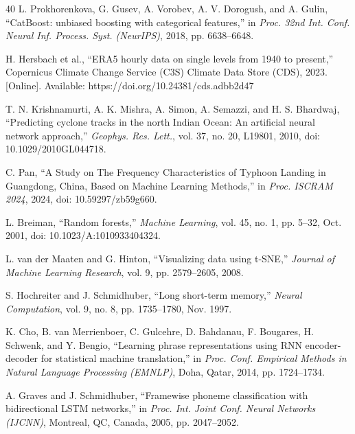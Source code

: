 \documentclass{ametsocv6.1}
\begin{document}
\begin{thebibliography}{40}
L. Prokhorenkova, G. Gusev, A. Vorobev, A. V. Dorogush, and A. Gulin, ``CatBoost: unbiased boosting with categorical features,'' in \textit{Proc. 32nd Int. Conf. Neural Inf. Process. Syst. (NeurIPS)}, 2018, pp. 6638--6648.

H. Hersbach et al., ``ERA5 hourly data on single levels from 1940 to present,'' Copernicus Climate Change Service (C3S) Climate Data Store (CDS), 2023. [Online]. Available: https://doi.org/10.24381/cds.adbb2d47

T. N. Krishnamurti, A. K. Mishra, A. Simon, A. Semazzi, and H. S. Bhardwaj, ``Predicting cyclone tracks in the north Indian Ocean: An artificial neural network approach,'' \textit{Geophys. Res. Lett.}, vol. 37, no. 20, L19801, 2010, doi: 10.1029/2010GL044718.

C. Pan, ``A Study on The Frequency Characteristics of Typhoon Landing in Guangdong, China, Based on Machine Learning Methods,'' in \textit{Proc. ISCRAM 2024}, 2024, doi: 10.59297/zb59g660.

L. Breiman, ``Random forests,'' \textit{Machine Learning}, vol. 45, no. 1, pp. 5--32, Oct. 2001, doi: 10.1023/A:1010933404324.

L. van der Maaten and G. Hinton, ``Visualizing data using t-SNE,'' \textit{Journal of Machine Learning Research}, vol. 9, pp. 2579--2605, 2008.

S. Hochreiter and J. Schmidhuber, ``Long short-term memory,'' \textit{Neural Computation}, vol. 9, no. 8, pp. 1735--1780, Nov. 1997.

K. Cho, B. van Merrienboer, C. Gulcehre, D. Bahdanau, F. Bougares, H. Schwenk, and Y. Bengio, ``Learning phrase representations using RNN encoder-decoder for statistical machine translation,'' in \textit{Proc. Conf. Empirical Methods in Natural Language Processing (EMNLP)}, Doha, Qatar, 2014, pp. 1724--1734.

A. Graves and J. Schmidhuber, ``Framewise phoneme classification with bidirectional LSTM networks,'' in \textit{Proc. Int. Joint Conf. Neural Networks (IJCNN)}, Montreal, QC, Canada, 2005, pp. 2047--2052.


\end{thebibliography}
\end{document}
